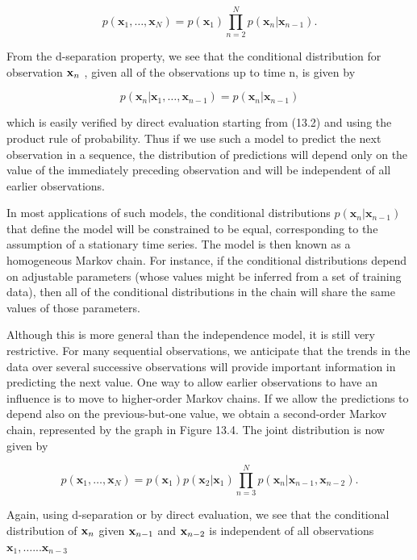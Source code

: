 \documentclass[
  10
]{article}
\begin{document}
\[
p (\mathbf {x} _ {1}, \dots , \mathbf {x} _ {N}) = p (\mathbf {x} _ {1}) \prod_ {n = 2} ^ {N} p (\mathbf {x} _ {n} | \mathbf {x} _ {n - 1}).\tag{13.2}
\]

From the d-separation property, we see that the conditional distribution
for observation \({ \bf x } _ { n }\) , given all of the observations up
to time n, is given by

\[
p (\mathbf {x} _ {n} | \mathbf {x} _ {1}, \dots , \mathbf {x} _ {n - 1}) = p (\mathbf {x} _ {n} | \mathbf {x} _ {n - 1})\tag{13.3}
\]

which is easily verified by direct evaluation starting from (13.2) and
using the product rule of probability. Thus if we use such a model to
predict the next observation in a sequence, the distribution of
predictions will depend only on the value of the immediately preceding
observation and will be independent of all earlier observations.

In most applications of such models, the conditional distributions
\(p ( \mathbf { x } _ { n } | \mathbf { x } _ { n - 1 } )\) that define
the model will be constrained to be equal, corresponding to the
assumption of a stationary time series. The model is then known as a
homogeneous Markov chain. For instance, if the conditional distributions
depend on adjustable parameters (whose values might be inferred from a
set of training data), then all of the conditional distributions in the
chain will share the same values of those parameters.

Although this is more general than the independence model, it is still
very restrictive. For many sequential observations, we anticipate that
the trends in the data over several successive observations will provide
important information in predicting the next value. One way to allow
earlier observations to have an influence is to move to higher-order
Markov chains. If we allow the predictions to depend also on the
previous-but-one value, we obtain a second-order Markov chain,
represented by the graph in Figure 13.4. The joint distribution is now
given by

\[
p (\mathbf {x} _ {1}, \dots , \mathbf {x} _ {N}) = p (\mathbf {x} _ {1}) p (\mathbf {x} _ {2} | \mathbf {x} _ {1}) \prod_ {n = 3} ^ {N} p (\mathbf {x} _ {n} | \mathbf {x} _ {n - 1}, \mathbf {x} _ {n - 2}).\tag{13.4}
\]

Again, using d-separation or by direct evaluation, we see that the
conditional distribution of \({ \bf x } _ { n }\) given
\({ \bf x } _ { n - 1 }\) and \({ \bf x } _ { n - 2 }\) is independent
of all observations
\(\mathbf { x } _ { 1 } , \ldots . . . \mathbf { x } _ { n - 3 }\)
\end{document}
